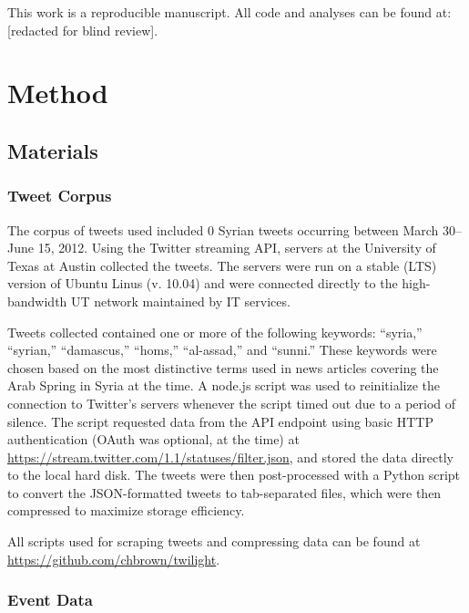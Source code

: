 \documentclass[english,man]{apa6}
\begin{document}
This work is a reproducible manuscript. All code and analyses can be found at:
{[}redacted for blind review{]}.

\hypertarget{method}{%
\section{Method}\label{method}}

\hypertarget{materials}{%
\subsection{Materials}\label{materials}}

\hypertarget{tweet-corpus}{%
\subsubsection{Tweet Corpus}\label{tweet-corpus}}

The corpus of tweets used included 0 Syrian tweets
occurring between March 30--June 15, 2012. Using the Twitter streaming API,
servers at the University of Texas at Austin collected the tweets. The servers
were run on a stable (LTS) version of Ubuntu Linus (v. 10.04) and were connected
directly to the high-bandwidth UT network maintained by IT services.

Tweets collected contained one or more of the following keywords: \enquote{syria,}
\enquote{syrian,} \enquote{damascus,} \enquote{homs,} \enquote{al-assad,} and \enquote{sunni.} These keywords were
chosen based on the most distinctive terms used in news articles covering the
Arab Spring in Syria at the time. A node.js script was used to reinitialize the
connection to Twitter's servers whenever the script timed out due to a period of
silence. The script requested data from the API endpoint using basic HTTP
authentication (OAuth was optional, at the time) at
\url{https://stream.twitter.com/1.1/statuses/filter.json}, and stored the data
directly to the local hard disk. The tweets were then post-processed with a
Python script to convert the JSON-formatted tweets to tab-separated files, which
were then compressed to maximize storage efficiency.

All scripts used for scraping tweets and compressing data can be found at
\url{https://github.com/chbrown/twilight}.

\hypertarget{event-data}{%
\subsubsection{Event Data}\label{event-data}}
\end{document}
